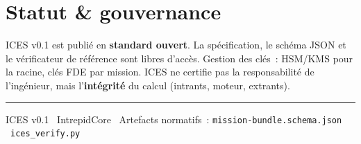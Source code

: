 \documentclass[11pt,a4paper]{article}
\begin{document}
\section{Statut \& gouvernance}
ICES v0.1 est publié en \textbf{standard ouvert}. La spécification, le schéma JSON et le
vérificateur de référence sont libres d'accès. Gestion des clés~: HSM/KMS pour la racine, clés
FDE par mission. ICES ne certifie pas la responsabilité de l'ingénieur, mais l'\textbf{intégrité}
du calcul (intrants, moteur, extrants).

\vspace{0.3cm}\rule{\linewidth}{0.4pt}
\begin{center}\footnotesize\color{gray}
ICES v0.1 \textperiodcentered\ IntrepidCore \textperiodcentered\ Artefacts normatifs~:
\texttt{mission-bundle.schema.json} \textperiodcentered\ \texttt{ices\_verify.py}
\end{center}
\end{document}
